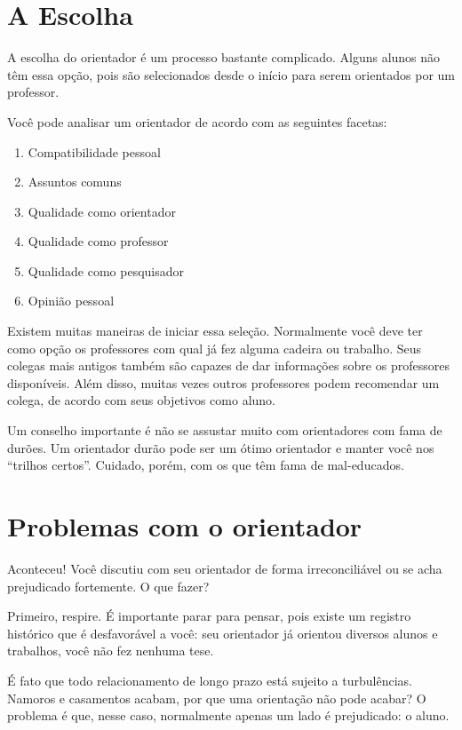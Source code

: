 \section{A Escolha}


A escolha do orientador é um processo bastante complicado. Alguns alunos não têm essa opção, pois são selecionados desde o início para serem orientados por um professor. 


Você pode analisar um orientador de acordo com as seguintes facetas:
\begin{enumerate}
	\item 	Compatibilidade pessoal
	\item 	Assuntos comuns
	\item 	Qualidade como orientador
	\item 	Qualidade como professor
	\item 	Qualidade como pesquisador
	\item 	Opinião pessoal
\end{enumerate}

Existem muitas maneiras de iniciar essa seleção. Normalmente você deve ter como opção os professores com qual já fez alguma cadeira ou trabalho. Seus colegas mais antigos também são capazes de dar informações sobre os professores disponíveis. Além disso, muitas vezes outros professores podem recomendar um colega, de acordo com seus objetivos como aluno.


Um conselho importante é não se assustar muito com orientadores com fama de durões. Um orientador durão pode ser um ótimo orientador e manter você nos ``trilhos certos''. Cuidado, porém, com os que têm fama de mal-educados.


\section{Problemas com o orientador}


Aconteceu! Você discutiu com seu orientador de forma irreconciliável ou se acha prejudicado fortemente. O que fazer?

Primeiro, respire. É importante parar para pensar, pois existe um registro histórico que é desfavorável a você: seu orientador já orientou diversos alunos e trabalhos, você não fez nenhuma tese.

É fato que todo relacionamento de longo prazo está sujeito a turbulências. Namoros e casamentos acabam, por que uma orientação não pode acabar? O problema é que, nesse caso, normalmente apenas um lado é prejudicado: o aluno.

